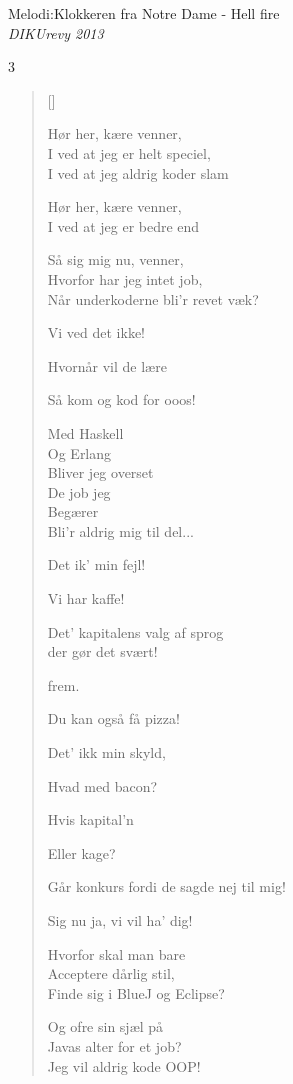 {Melodi:Klokkeren fra Notre Dame - Hell fire}\\[.2em]
{\small\itshape DIKUrevy 2013}
\begin{multicols}3
\settowidth{\versewidth}{Hvorfor har jeg intet job,}
\begin{verse}[\versewidth]

Hør her, kære venner,\\
I ved at jeg er helt speciel,\\
I ved at jeg aldrig koder slam


Hør her, kære venner,\\
I ved at jeg er bedre end


Så sig mig nu, venner,\\
Hvorfor har jeg intet job,\\
Når underkoderne bli'r revet væk?

Vi ved det ikke!

Hvornår vil de lære

Så kom og kod for ooos!

Med Haskell\\
Og Erlang\\
Bliver jeg overset\\
De job jeg\\
Begærer\\
Bli'r aldrig mig til del...



Det ik' min fejl!

Vi har kaffe!

Det' kapitalens valg af sprog\\
der gør det svært!

  frem.

Du kan også få pizza!

Det' ikk min skyld,

Hvad med bacon?

Hvis kapital'n

Eller kage?

Går konkurs fordi de sagde nej til mig!

Sig nu ja, vi vil ha' dig!

Hvorfor skal man bare\\
Acceptere dårlig stil,\\
Finde sig i BlueJ og Eclipse?

Og ofre sin sjæl på\\
Javas alter for et job?\\
Jeg vil aldrig kode OOP!


\end{verse}
\end{multicols}
